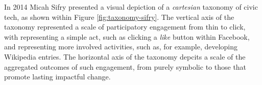 In 2014 Micah Sifry \cite{micah-sifry-taxonomy} presented a visual depiction of a \emph{cartesian} taxonomy of civic tech, as shown within Figure \ref{fig:taxonomy-sifry}.
The vertical axis of the taxonomy represented a scale of participatory engagement from thin to click,
with  representing a simple act, such as clicking a \emph{like} button within Facebook,
and  representing more involved activities, such as, for example, developing Wikipedia entries.
The horizontal axis of the taxonomy depcits a scale of the aggregated outcomes of such engagement, 
from purely symbolic to those that promote lasting impactful change.
